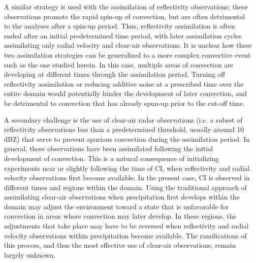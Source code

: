 A similar strategy is used with the assimilation of reflectivity observations; these observations promote the rapid spin-up of convection, but are often detrimental to the analyses after a spin-up period. Thus, reflectivity assimilation is often ended after an initial predetermined time period, with later assimilation cycles assimilating only radial velocity and clear-air observations. It is unclear how these two assimilation strategies can be generalized to a more complex convective event such as the one studied herein. In this case, multiple areas of convection are developing at different times through the assimilation period. Turning off reflectivity assimilation or reducing additive noise at a prescribed time over the entire domain would potentially hinder the development of later convection, and be detrimental to convection that has already spun-up prior to the cut-off time.

A secondary challenge is the use of clear-air radar observations (i.e. a subset of reflectivity observations less than a predetermined threshold, usually around 10 dBZ) that serve to prevent spurious convection during the assimilation period. In general, these observations have been assimilated following the initial development of convection. This is a natural consequence of initializing experiments near or slightly following the time of CI, when reflectivity and radial velocity observations first become available. In the present case, CI is observed in different times and regions within the domain. Using the traditional approach of assimilating clear-air observations when precipitation first develops within the domain may adjust the environment toward a state that is unfavorable for convection in areas where convection may later develop. In these regions, the adjustments that take place may have to be reversed when reflectivity and radial velocity observations within precipitation become available. The ramifications of this process, and thus the most effective use of clear-air observations, remain largely unknown.

